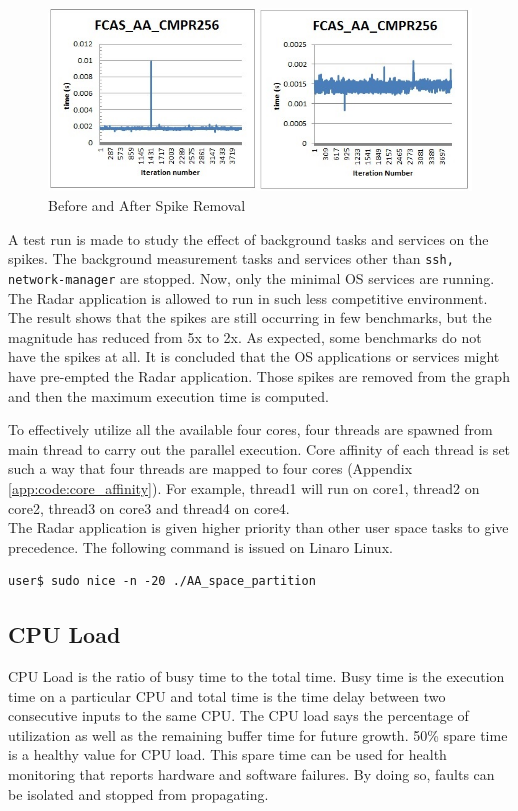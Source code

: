 \begin{figure}[h!]
	\centering
	\includegraphics[width=150mm]{figures/chop_off}
	\caption{Before and After Spike Removal}
	\label{fig:mm:chop_off}
\end{figure}
A test run is made to study the effect of background tasks and services on the spikes. The background measurement tasks and services other than \verb|ssh, network-manager| are stopped. Now, only the minimal OS services are running. The Radar application is allowed to run in such less competitive environment. The result shows that the spikes are still occurring in few benchmarks, but the magnitude has reduced from 5x to 2x. As expected, some benchmarks do not have the spikes at all. It is concluded that the OS applications or services might have pre-empted the Radar application. Those spikes are removed from the graph and then the maximum execution time is computed. \vspace*{0.2cm}

To effectively utilize all the available four cores, four threads are spawned from main thread to carry out the parallel execution. Core affinity of each thread is set such a way that four threads are mapped to four cores (Appendix \ref{app:code:core_affinity}). For example, thread1 will run on core1, thread2 on core2, thread3 on core3 and thread4 on core4.\\
The Radar application is given higher priority than other user space tasks to give precedence. The following command is issued on Linaro Linux. 
\begin{lstlisting}
user$ sudo nice -n -20 ./AA_space_partition
\end{lstlisting}

\subsection{CPU Load}
\label{ss:mm:cpu_load}
CPU Load is the ratio of busy time to the total time. Busy time is the execution time on a particular CPU and total time is the time delay between two consecutive inputs to the same CPU. The CPU load says the percentage of utilization as well as the remaining buffer time for future growth. 50\% spare time is a healthy value for CPU load. This spare time can be used for health monitoring that reports hardware and software failures. By doing so, faults can be isolated and stopped from propagating.

